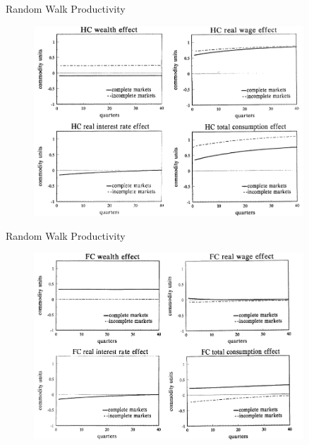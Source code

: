 \documentclass[10pt]{beamer}
\begin{document}
\begin{frame}{Random Walk Productivity}
\begin{figure}[thbp]
  \centering
  \includegraphics[width=0.90\textwidth]{13.png}
\end{figure}
\end{frame}

\begin{frame}{Random Walk Productivity}
\begin{figure}[thbp]
  \centering
  \includegraphics[width=0.90\textwidth]{14.png}
\end{figure}
\end{frame}
\end{document}
